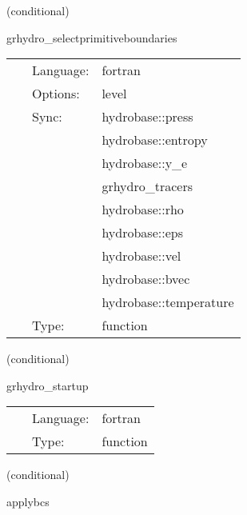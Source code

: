 \vspace{5mm}

   (conditional) 

\hspace{5mm} grhydro\_selectprimitiveboundaries 

\hspace{5mm}{\it select primitive variables for boundary conditions } 


\hspace{5mm}

 \begin{tabular*}{160mm}{cll} 
~ & Language:  & fortran \\ 
~ & Options:  & level \\ 
~ & Sync:  & hydrobase::press \\ 
~& ~ &hydrobase::entropy\\ 
~& ~ &hydrobase::y\_e\\ 
~& ~ &grhydro\_tracers\\ 
~& ~ &hydrobase::rho\\ 
~& ~ &hydrobase::eps\\ 
~& ~ &hydrobase::vel\\ 
~& ~ &hydrobase::bvec\\ 
~& ~ &hydrobase::temperature\\ 
~ & Type:  & function \\ 
\end{tabular*} 


\vspace{5mm}

   (conditional) 

\hspace{5mm} grhydro\_startup 

\hspace{5mm}{\it startup banner } 


\hspace{5mm}

 \begin{tabular*}{160mm}{cll} 
~ & Language:  & fortran \\ 
~ & Type:  & function \\ 
\end{tabular*} 


\vspace{5mm}

   (conditional) 

\hspace{5mm} applybcs 

